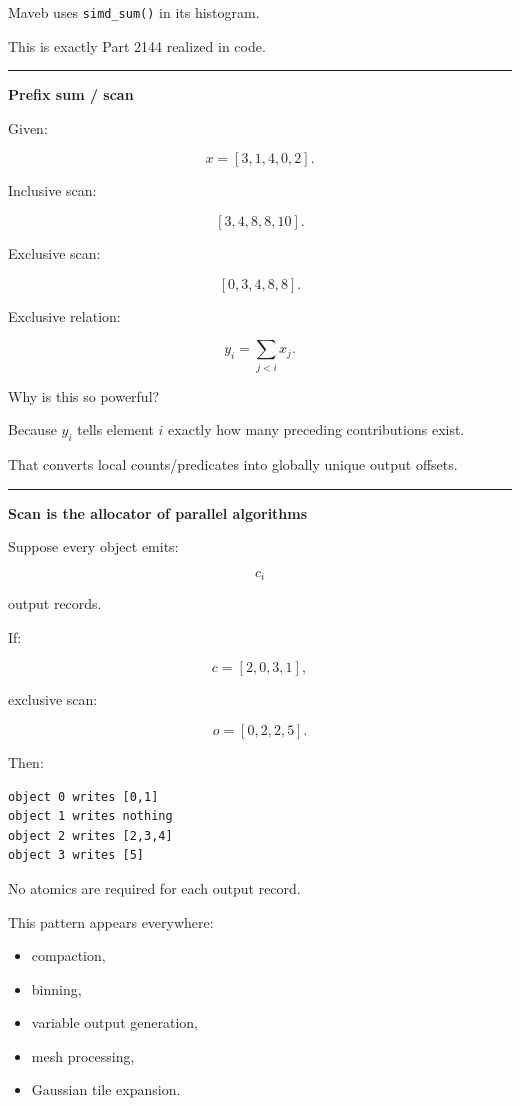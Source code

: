 Maveb uses \texttt{simd\_sum()} in its histogram.

This is exactly Part 2144 realized in code.

\begin{center}\rule{0.5\linewidth}{0.5pt}\end{center}

\textbf{Prefix sum / scan}

Given:

\[
x=
[3,1,4,0,2].
\]

Inclusive scan:

\[
[3,4,8,8,10].
\]

Exclusive scan:

\[
\boxed{
[0,3,4,8,8].
}
\]

Exclusive relation:

\[
y_i=
\sum_{j<i}x_j.
\]

Why is this so powerful?

Because \(y_i\) tells element \(i\) exactly how many preceding contributions exist.

That converts local counts/predicates into globally unique output offsets.

\begin{center}\rule{0.5\linewidth}{0.5pt}\end{center}

\textbf{Scan is the allocator of parallel algorithms}

Suppose every object emits:

\[
c_i
\]

output records.

If:

\[
c=[2,0,3,1],
\]

exclusive scan:

\[
o=[0,2,2,5].
\]

Then:

\protect{}\label{9j7ww5}%
\begin{verbatim}
object 0 writes [0,1]
object 1 writes nothing
object 2 writes [2,3,4]
object 3 writes [5]
\end{verbatim}

No atomics are required for each output record.

This pattern appears everywhere:

\begin{itemize}
\tightlist
\item
  compaction,
\item
  binning,
\item
  variable output generation,
\item
  mesh processing,
\item
  Gaussian tile expansion.
\end{itemize}

